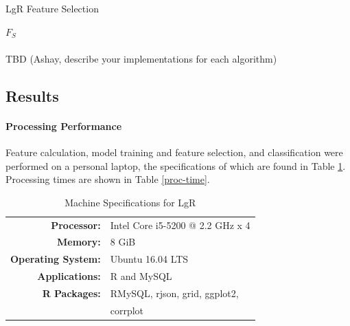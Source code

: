 \documentclass[fleqn,10pt]{SelfArx} %
\begin{document}
\begin{algorithm}
	\caption{LgR Feature Selection}
	\label{alg:3}
	\begin{algorithmic}[1]
		\ENDIF
		\ENDIF
		\ENDFOR
		\ENDWHILE
		\RETURN $F_S$
	\end{algorithmic}
\end{algorithm}

\paragraph{}TBD (Ashay, describe your implementations for each algorithm)

\subsection{Results}

\paragraph{Processing Performance}
Feature calculation, model training and feature selection, and classification were performed on a personal laptop, the specifications of which are found in Table \ref{machine-specs}.  Processing times are shown in Table \ref{proc-time}.

\begin{table}[H]
	\centering
	\caption{Machine Specifications for LgR}\label{machine-specs}
	\begin{tabular}{r l}
		\toprule
		\textbf{Processor:} 		& Intel Core i5-5200 @ 2.2 GHz x 4 \\
		\textbf{Memory:}			& 8 GiB \\
		\textbf{Operating System:}	& Ubuntu 16.04 LTS \\
		\textbf{Applications:}		& R and MySQL \\
		\textbf{R Packages:}		& RMySQL, rjson, grid, ggplot2, \\
									& corrplot
	\end{tabular}
\end{table}
\end{document}
